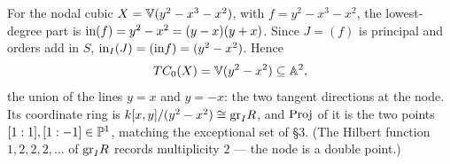 \documentclass[11pt]{article}
\begin{document}
\begin{example}
    For the nodal cubic $X = \V(y^2 - x^3 - x^2)$, with $f = y^2 - x^3 - x^2$, the lowest-degree part is $\init(f) = y^2 - x^2 = (y-x)(y+x)$. Since $J = (f)$ is principal and orders add in $S$, $\init_I(J) = (\init f) = (y^2 - x^2)$. Hence
    \[TC_0(X) = \V(y^2 - x^2) \subseteq \A^2,\]
    the union of the lines $y = x$ and $y = -x$: the two tangent directions at the node. Its coordinate ring is $k[x,y]/(y^2-x^2) \iso \gr_I R$, and $\Proj$ of it is the two points $[1:1], [1:-1] \in \P^1$, matching the exceptional set of \S3. (The Hilbert function $1, 2, 2, 2, \ldots$ of $\gr_I R$ records multiplicity $2$ --- the node is a double point.)
\end{example}
\end{document}
